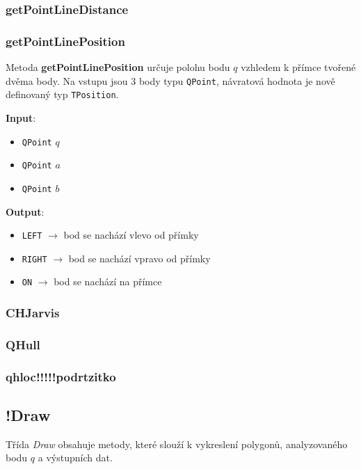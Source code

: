 \documentclass[a4paper, 12pt]{article}
\begin{document}
\subsubsection{getPointLineDistance}




\subsubsection{getPointLinePosition}
Metoda \textbf{getPointLinePosition} určuje polohu bodu $q$ vzhledem k přímce tvořené dvěma body. Na vstupu jsou 3 body typu \texttt{QPoint}, návratová hodnota je nově definovaný typ \texttt{TPosition}.

\textbf{Input}:
\begin{itemize}
\item \texttt{QPoint} $q$
\item \texttt{QPoint} $a$
\item \texttt{QPoint} $b$
\end{itemize}

\textbf{Output}:
\begin{itemize}
\item \texttt{LEFT} $\rightarrow$ bod se nachází vlevo od přímky
\item \texttt{RIGHT} $\rightarrow$ bod se nachází vpravo od přímky
\item \texttt{ON} $\rightarrow$ bod se nachází na přímce
\end{itemize}


\subsubsection{CHJarvis}



\subsubsection{QHull}




\subsubsection{qhloc!!!!!podrtzitko}


\subsection{!Draw}
Třída \textsl{Draw} obsahuje metody, které slouží k vykreslení polygonů, analyzovaného bodu $q$ a výstupních dat.
\end{document}
